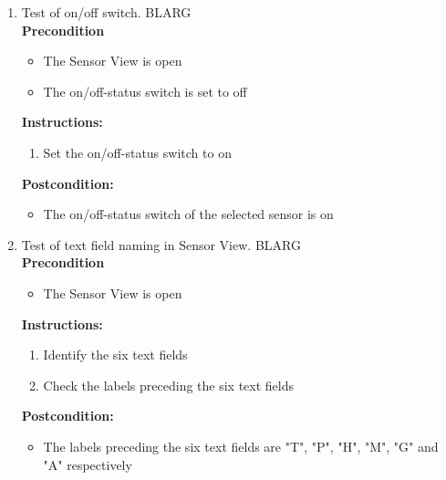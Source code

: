 \documentclass[a4paper]{article}
\newlength{\testlabellength}
\newenvironment{testlist}{\begin{enumerate}[label=\bfseries Instruction \thesubsection.\arabic* , labelindent=0pt, labelwidth=\testlabellength , leftmargin=2cm]}{\end{enumerate}}
\newenvironment{precondition}{
{\color{white}BLARG}\\ 
\textbf{Precondition}
\begin{itemize}[labelindent=0cm, labelwidth=2cm , leftmargin=1cm]
}
{\end{itemize}}
\newenvironment{instruction}{
\textbf{Instructions:}
\begin{enumerate}[label=\bfseries  \arabic*., labelindent=0cm, labelwidth=2cm , leftmargin=1cm]
}
{\end{enumerate}}
\newenvironment{postcondition}{
\textbf{Postcondition:}
\begin{itemize}[labelindent=0cm, labelwidth=2cm , leftmargin=1cm]
}
{\end{itemize}}
\begin{document}
\begin{appendices}
\begin{testlist}

	\item Test of on/off switch.
		\begin{precondition}
			\item The Sensor View is open
			\item The on/off-status switch is set to off
		\end{precondition}
		\begin{instruction}
			\item Set the on/off-status switch to on
	  	\end{instruction}
	  	\begin{postcondition}
	  		\item The on/off-status switch of the selected sensor is on
	  	\end{postcondition}

	\item Test of text field naming in Sensor View.
		\begin{precondition}
			\item The Sensor View is open
		\end{precondition}
		
		\begin{instruction}
			\item Identify the six text fields
			\item Check the labels preceding the six text fields
		\end{instruction}		
		
		\begin{postcondition}
			\item The labels preceding the six text fields are "T", "P", "H", "M", "G" and "A" respectively
		\end{postcondition}


\end{testlist}
\end{appendices}
\end{document}
